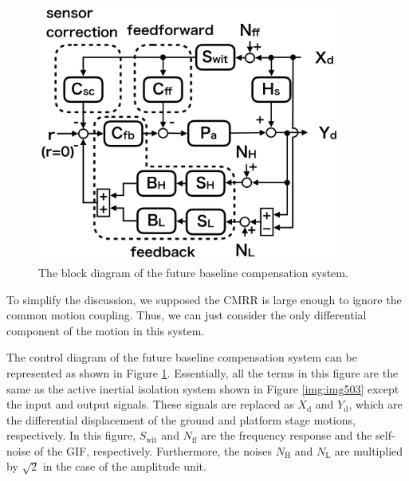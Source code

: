 \begin{figure}[h]
  \begin{center}   
    \includegraphics[width=10cm]{./img_chap5/img511.png}
    \caption{The block diagram of the future baseline compensation system.} \label{img:img511}
  \end{center}
\end{figure}

To simplify the discussion, we supposed the CMRR is large enough to ignore the common motion coupling. Thus, we can just consider the only differential component of the motion in this system.

The control diagram of the future baseline compensation system can be represented as shown in Figure \ref{img:img511}. Essentially, all the terms in this figure are the same as the active inertial isolation system shown in Figure \ref{img:img503} except the input and output signals. These signals are replaced as $X_{\mathrm{d}}$ and $Y_{\mathrm{d}}$, which are the differential displacement of the ground and platform stage motions, respectively. In this figure,  $S_{\mathrm{wit}}$ and $N_{\mathrm{ff}}$ are the frequency response and the self-noise of the GIF, respectively. Furthermore, the noises $N_{\mathrm{H}}$ and $N_{\mathrm{L}}$ are multiplied by $\sqrt{2}$ in the case of the amplitude unit.

